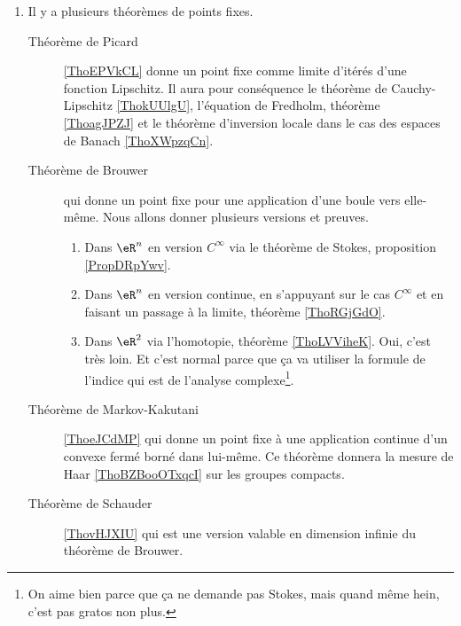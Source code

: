 

    \begin{enumerate}
\item 
    Il y a plusieurs théorèmes de points fixes.
    \begin{description}
        \item[Théorème de Picard] \ref{ThoEPVkCL} donne un point fixe comme limite d'itérés d'une fonction Lipschitz. Il aura pour conséquence le théorème de Cauchy-Lipschitz \ref{ThokUUlgU}, l'équation de Fredholm, théorème \ref{ThoagJPZJ} et le théorème d'inversion locale dans le cas des espaces de Banach \ref{ThoXWpzqCn}.
    \item[Théorème de Brouwer] qui donne un point fixe pour une application d'une boule vers elle-même. Nous allons donner plusieurs versions et preuves.
            \begin{enumerate}
                \item
                    Dans \( \eR^n\) en version \( C^{\infty}\) via le théorème de Stokes, proposition \ref{PropDRpYwv}.
                \item
                    Dans \( \eR^n\) en version continue, en s'appuyant sur le cas \( C^{\infty}\) et en faisant un passage à la limite, théorème \ref{ThoRGjGdO}.
                \item
                    Dans \( \eR^2\) via l'homotopie, théorème \ref{ThoLVViheK}. Oui, c'est très loin. Et c'est normal parce que ça va utiliser la formule de l'indice qui est de l'analyse complexe\footnote{On aime bien parce que ça ne demande pas Stokes, mais quand même hein, c'est pas gratos non plus.}.
            \end{enumerate}
        \item[Théorème de Markov-Kakutani]\ref{ThoeJCdMP} qui donne un point fixe à une application continue d'un convexe fermé borné dans lui-même. Ce théorème donnera la mesure de Haar \ref{ThoBZBooOTxqcI} sur les groupes compacts.
        \item[Théorème de Schauder] \ref{ThovHJXIU} qui est une version valable en dimension infinie du théorème de Brouwer. 
    \end{description}


\end{enumerate}
